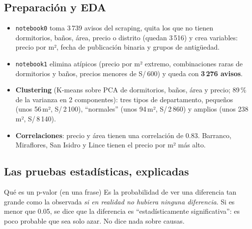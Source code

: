 \documentclass[11pt,a4paper]{article}
\begin{document}
\subsection{Preparación y EDA}
\begin{itemize}
\item \texttt{notebook0} toma 3\,739 avisos del scraping, quita los que no tienen dormitorios, baños, área, precio o distrito (quedan 3\,516) y crea variables: precio por m², fecha de publicación binaria y grupos de antigüedad.
\item \texttt{notebook1} elimina atípicos (precio por m² extremo, combinaciones raras de dormitorios y baños, precios menores de S/\,600) y queda con \textbf{3\,276 avisos}.
\item \textbf{Clustering} (K-means sobre PCA de dormitorios, baños, área y precio; 89\,\% de la varianza en 2 componentes): tres tipos de departamento, pequeños (unos 56\,m², S/\,2\,100), ``normales'' (unos 94\,m², S/\,2\,860) y amplios (unos 238\,m², S/\,8\,140).
\item \textbf{Correlaciones}: precio y área tienen una correlación de 0.83. Barranco, Miraflores, San Isidro y Lince tienen el precio por m² más alto.
\end{itemize}

\subsection{Las pruebas estadísticas, explicadas}

\begin{idea}{Qué es un p-valor (en una frase)}
Es la probabilidad de ver una diferencia tan grande como la observada \emph{si en realidad no hubiera ninguna diferencia}. Si es menor que 0.05, se dice que la diferencia es ``estadísticamente significativa'': es poco probable que sea solo azar. No dice nada sobre causas.
\end{idea}
\end{document}
